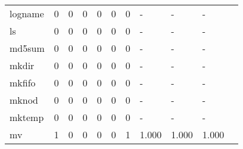 \begin{longtable}{lp{1.10cm}p{1.10cm}p{1.10cm}p{1.10cm}p{1.10cm}p{1.10cm}p{1.10cm}p{1.10cm}p{1.10cm}p{1.10cm}}
logname   &                      0 &                                  0 &                                 0 &                                0 &                                 0 &                               0 &                              - &                                     - &                                   - \\
ls        &                      0 &                                  0 &                                 0 &                                0 &                                 0 &                               0 &                              - &                                     - &                                   - \\
md5sum    &                      0 &                                  0 &                                 0 &                                0 &                                 0 &                               0 &                              - &                                     - &                                   - \\
mkdir     &                      0 &                                  0 &                                 0 &                                0 &                                 0 &                               0 &                              - &                                     - &                                   - \\
mkfifo    &                      0 &                                  0 &                                 0 &                                0 &                                 0 &                               0 &                              - &                                     - &                                   - \\
mknod     &                      0 &                                  0 &                                 0 &                                0 &                                 0 &                               0 &                              - &                                     - &                                   - \\
mktemp    &                      0 &                                  0 &                                 0 &                                0 &                                 0 &                               0 &                              - &                                     - &                                   - \\
mv        &                      1 &                                  0 &                                 0 &                                0 &                                 0 &                               1 &                          1.000 &                                 1.000 &                               1.000 \\

\end{longtable}

